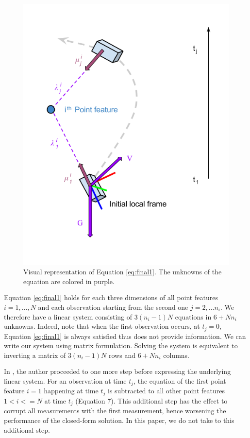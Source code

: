 \documentclass[letterpaper, 10 pt, conference]{ieeeconf}  %
\begin{document}
\begin{figure}[h!]
  \centering
  \includegraphics[width=0.90\columnwidth]{images/closedFormExplained}
  \caption{Visual representation of Equation \ref{eq:final1}.
  The unknowns of the equation are colored in \textcolor{amethyst}{purple}.}
\end{figure}

Equation \ref{eq:final1} holds for each three dimensions of all point features $i=1,...,N$ and each observation starting from the second one $j=2,...n_i$.
We therefore have a linear system consisting of $3(n_i-1)N$ equations in $6 + Nn_i$ unknowns.
Indeed, note that when the first observation occurs, at $t_j = 0$,
Equation \ref{eq:final1} is always satisfied thus does not provide information.
We can write our system using matrix formulation.
Solving the system is equivalent to inverting a matrix of $3(n_i-1)N$ rows and $6+Nn_i$ columns.

In \cite{Martinelli2014}, the author proceeded to one more step before expressing the underlying linear system.
For an observation at time $t_j$, the equation of the first point feature $i=1$ happening at time $t_j$ is subtracted to all other point features $1<i<=N$ at time $t_j$ (Equation 7).
This additional step has the effect to corrupt all measurements with the first measurement,
hence worsening the performance of the closed-form solution.
In this paper, we do not take to this additional step.
\end{document}
